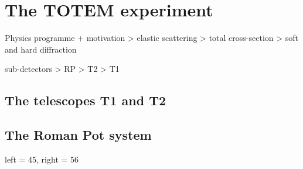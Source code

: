 \chapter{The TOTEM experiment}

\> Physics programme + motivation
\>> elastic scattering
\>> total cross-section
\>> soft and hard diffraction

 sub-detectors
\>> RP
\>> T2
\>> T1



\section[telescopes]{The telescopes T1 and T2}

\section[rp system]{The Roman Pot system}

\> left = 45, right = 56

\iffalse
\bmfig
\fig[8cm]{fig/external/RP_stations_original.pdf}{rp stations}{[7cm]RP stations}
\fig[6cm]{fig/external/rp_unit.jpg}{rp unit}{[7cm]RP unit}
\emfig

\bmfig
\fig[6cm]{fig/external/rp.jpg}{rp rp}{[7cm]A Roman Pot}
\fig[6cm]{fig/external/rp_package.jpg}{rp package}{[7cm]Detector package}
\emfig

\bmfig
\fig[6cm]{fig/external/hybrid2.jpg}{rp hybrid}{[7cm]A hybrid with a silicon detector and four VFAT chips.}
\fig[6cm]{fig/external/silicon_explained.png}{rp sensor}{[7cm]A detail of a silicon sensor.}
\emfig
\fi


\iffalse
NOT THE RIGHT PLACE?
\> Naming schemes
\>> official \bref{totem-rp-naming} arm-station-unit-pot-plane-vfat-strip
\>> OfflineSW |arm|station|pot|plane|vfat

\tab[\strut\quad#\quad\hfil&\quad#\quad\hfil&\quad#\quad\hfil\cr]{rp naming schemes}{RP system naming schemes}{\bln
& official & SW\cr\bln
arm		& 45, 56		& 0, 1\cr
station	& 147, 220		& 0, 2\cr
unit	& far, near		& -\cr
pot		& top, bot, hor	& near: 0 (top), 1 (bot), 2 (hor)\cr
		& 				& far:  3 (hor), 4 (top), 5 (bot)\cr
plane	& 1 to 10		& 0 to 9\cr
vfat	& 1 to 4		& 0 to 3\cr
strip	& 0 to 127		& -\cr\bln
}
\fi

